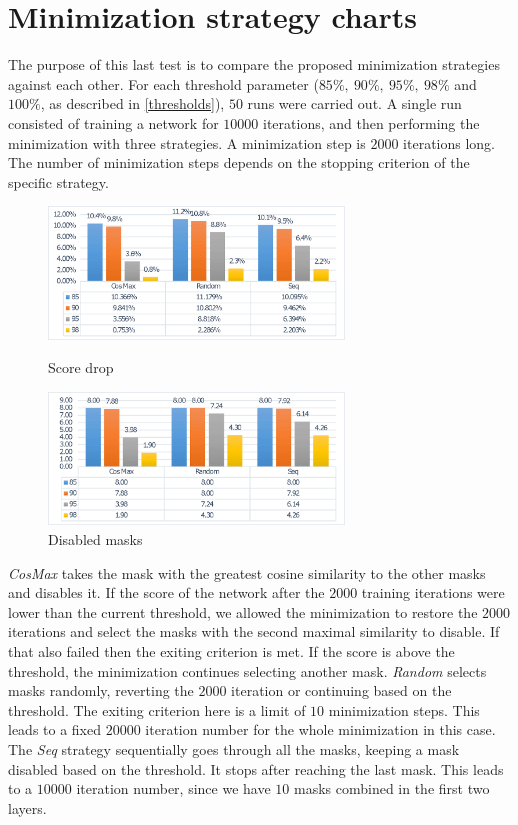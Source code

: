 \documentclass[12pt]{report}
\begin{document}
\newpage
\section{Minimization strategy charts}
The purpose of this last test is to compare the proposed minimization strategies against each other. For each threshold parameter ($ 85\%,\ 90\%,\ 95\%,\ 98\%$ and $100\%$, as described in \ref{thresholds}), $50$ runs were carried out. A single run consisted of training a network for $10000$
iterations, and then performing the minimization with three strategies. A minimization step is $2000$ iterations long. The number of minimization steps depends on the stopping criterion of the specific strategy.

\begin{figure}
	\includegraphics[width=0.7\textwidth]{dia/stat2.eps}
	\caption{Score drop}
	\label{fin1}
	\includegraphics[width=0.7\textwidth]{dia/stat1.eps}
	\caption{Disabled masks}
	\label{fin2}
\end{figure}

\textit{CosMax} takes the mask with the greatest cosine similarity to the other masks and disables it. If the score of the network after the $2000$ training iterations were lower than the current threshold, we allowed the minimization to restore the $2000$ iterations and select the masks with the second maximal similarity to disable. If that also failed then the exiting criterion is met. If the score is above the threshold, the minimization continues selecting another mask. \textit{Random} selects masks randomly, reverting the $2000$ iteration or continuing based on the threshold. The exiting criterion here is a limit of $10$ minimization steps. This leads to a fixed $20000$ iteration number for the whole minimization in this case. The \textit{Seq} strategy sequentially goes through all the masks, keeping a mask disabled based on the threshold. It stops after reaching the last mask. This leads to a $10000$ iteration number, since we have $10$ masks combined in the first two layers.
\end{document}
